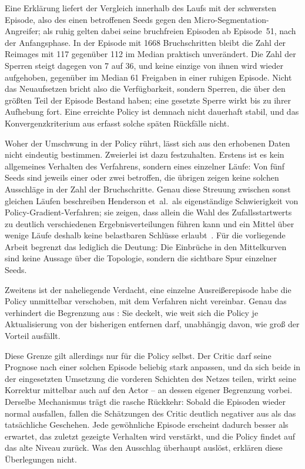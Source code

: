 Eine Erklärung liefert der Vergleich innerhalb des Laufs mit der schwersten
Episode, also des einen betroffenen Seeds gegen den
Micro-Segmentation-Angreifer; als ruhig gelten dabei seine bruchfreien
Episoden ab Episode~51, nach der Anfangsphase.
In der Episode mit \num{1668} Bruchschritten bleibt die Zahl
der Reimages mit 117 gegenüber 112 im Median praktisch unverändert. Die Zahl
der Sperren steigt dagegen von 7 auf 36, und keine einzige von ihnen wird
wieder aufgehoben, gegenüber im Median 61 Freigaben in einer ruhigen Episode. Nicht das
Neuaufsetzen bricht also die Verfügbarkeit, sondern Sperren, die über den
größten Teil der Episode Bestand haben; eine gesetzte Sperre wirkt bis zu
ihrer Aufhebung fort. Eine erreichte
Policy ist demnach nicht dauerhaft stabil, und das Konvergenzkriterium aus
 erfasst solche späten Rückfälle nicht.

Woher der Umschwung in der Policy rührt, lässt sich aus den erhobenen Daten
nicht eindeutig bestimmen. Zweierlei ist dazu festzuhalten. Erstens ist es kein
allgemeines Verhalten des Verfahrens, sondern eines einzelner Läufe: Von fünf
Seeds sind jeweils einer oder zwei betroffen, die übrigen zeigen keine solchen
Ausschläge in der Zahl der Bruchschritte.
Genau diese Streuung zwischen sonst gleichen Läufen beschreiben Henderson
et~al.\ als eigenständige Schwierigkeit von Policy-Gradient-Verfahren; sie
zeigen, dass allein die Wahl des Zufallsstartwerts zu deutlich verschiedenen
Ergebnisverteilungen führen kann und ein Mittel über wenige Läufe deshalb
keine belastbaren Schlüsse
erlaubt~\cite{henderson2019deepreinforcementlearningmatters}. Für die vorliegende Arbeit begrenzt das lediglich die Deutung: Die
Einbrüche in den Mittelkurven sind keine Aussage über die Topologie,
sondern die sichtbare Spur einzelner Seeds.

Zweitens ist der naheliegende Verdacht, eine einzelne Ausreißerepisode habe
die Policy unmittelbar verschoben, mit dem Verfahren nicht vereinbar. Genau
das verhindert die Begrenzung aus : Sie deckelt, wie weit
sich die Policy je Aktualisierung von der bisherigen entfernen darf,
unabhängig davon, wie groß der Vorteil ausfällt.

Diese Grenze gilt allerdings nur für die Policy selbst. Der Critic darf
seine Prognose nach einer solchen Episode beliebig stark anpassen, und da
sich beide in der eingesetzten Umsetzung die vorderen Schichten des Netzes
teilen, wirkt seine Korrektur mittelbar auch auf den Actor -- an dessen
eigener Begrenzung vorbei. Derselbe Mechanismus trägt die rasche Rückkehr:
Sobald die Episoden wieder normal ausfallen, fallen die Schätzungen des
Critic deutlich negativer aus als das tatsächliche Geschehen. Jede
gewöhnliche Episode erscheint dadurch besser als erwartet, das zuletzt
gezeigte Verhalten wird verstärkt, und die Policy findet auf das alte
Niveau zurück. Was den Ausschlag überhaupt auslöst, erklären diese Überlegungen
nicht.

